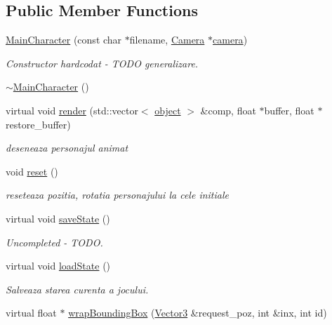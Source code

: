 \subsection*{Public Member Functions}
\begin{DoxyCompactItemize}
\item 
\hyperlink{class_main_character_ad9fb34855d2ba64910e20410c8e0c6ec}{Main\-Character} (const char $\ast$filename, \hyperlink{class_camera}{Camera} $\ast$\hyperlink{class_main_character_aed23e5d05c1fb771c303d4f3e180aa66}{camera})
\begin{DoxyCompactList}\small\item\em Constructor hardcodat -\/ T\-O\-D\-O generalizare. \end{DoxyCompactList}\item 
\hyperlink{class_main_character_a6d7d97ce443fa977a798ea1c956b0fc1}{$\sim$\-Main\-Character} ()
\item 
virtual void \hyperlink{class_main_character_adf0f10646b7e00949b7a594cbc161c64}{render} (std\-::vector$<$ \hyperlink{structobject}{object} $>$ \&comp, float $\ast$buffer, float $\ast$restore\-\_\-buffer)
\begin{DoxyCompactList}\small\item\em deseneaza personajul animat \end{DoxyCompactList}\item 
void \hyperlink{class_main_character_a5f57b318af6b7919ad7594603a35750c}{reset} ()
\begin{DoxyCompactList}\small\item\em reseteaza pozitia, rotatia personajului la cele initiale \end{DoxyCompactList}\item 
virtual void \hyperlink{class_main_character_aa5ae776c23b6f09beae33ac3ad015add}{save\-State} ()
\begin{DoxyCompactList}\small\item\em Uncompleted -\/ T\-O\-D\-O. \end{DoxyCompactList}\item 
virtual void \hyperlink{class_main_character_ad37c1d914626650e7d77b9d8ae58b4a5}{load\-State} ()
\begin{DoxyCompactList}\small\item\em Salveaza starea curenta a jocului. \end{DoxyCompactList}\item 
virtual float $\ast$ \hyperlink{class_main_character_a2615c112f8784972fa57b0c585a52ca8}{wrap\-Bounding\-Box} (\hyperlink{struct_vector3}{Vector3} \&request\-\_\-poz, int \&inx, int id)

\end{DoxyCompactItemize}
